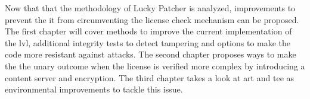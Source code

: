 Now that that the methodology of Lucky Patcher is analyzed, improvements to prevent the it from circumventing the license check mechanism can be proposed.
The first chapter will cover methods to improve the current implementation of the \gls{lvl}, additional integrity tests to detect tampering and options to make the code more resistant against attacks.
\newline
The second chapter proposes ways to make the the unary outcome when the license is verified more complex by introducing a content server and encryption.
\newline
The third chapter takes a look at \gls{art} and \gls{tee} as environmental improvements to tackle this issue.
